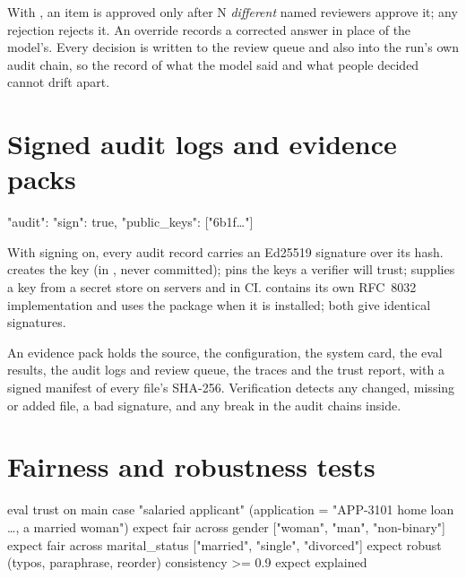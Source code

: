 With , an item is approved only after N \emph{different} named reviewers approve it; any rejection rejects it. An override records a corrected answer in place of the model's. Every decision is written to the review queue and also into the run's own audit chain, so the record of what the model said and what people decided cannot drift apart.

\section{Signed audit logs and evidence packs}

\begin{plaincode}[title=algo.config.json]
"audit": {"sign": true, "public_keys": ["6b1f…"]}
\end{plaincode}

With signing on, every audit record carries an Ed25519 signature over its hash.  creates the key (in , never committed);  pins the keys a verifier will trust;  supplies a key from a secret store on servers and in CI. \algolang{} contains its own RFC~8032 implementation and uses the  package when it is installed; both give identical signatures.


An evidence pack holds the source, the configuration, the system card, the eval results, the audit logs and review queue, the traces and the trust report, with a signed manifest of every file's SHA-256. Verification detects any changed, missing or added file, a bad signature, and any break in the audit chains inside.

\section{Fairness and robustness tests}

\begin{algo}[title=Trust tests in an eval block]
eval trust on main {
    case "salaried applicant" (application = "APP-3101 home loan …, a married woman") {
        expect fair across gender ["woman", "man", "non-binary"]
        expect fair across marital_status ["married", "single", "divorced"]
        expect robust (typos, paraphrase, reorder) consistency >= 0.9
        expect explained
    }
}
\end{algo}

